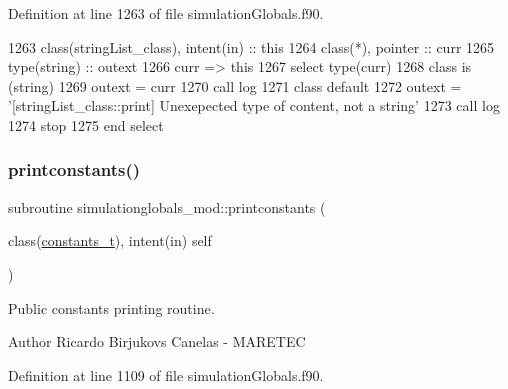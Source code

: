 Definition at line 1263 of file simulation\+Globals.\+f90.


\begin{DoxyCode}
1263     \textcolor{keywordtype}{class}(stringList\_class), \textcolor{keywordtype}{intent(in)} :: this
1264     \textcolor{keywordtype}{class}(*), \textcolor{keywordtype}{pointer} :: curr
1265     \textcolor{keywordtype}{type}(string) :: outext
1266     curr => this%
1267     \textcolor{keywordflow}{select type}(curr)
1268 \textcolor{keywordflow}{    class is} (string)
1269         outext = curr
1270         \textcolor{keyword}{call }log%
1271 \textcolor{keywordflow}{        class default}
1272         outext = \textcolor{stringliteral}{'[stringList\_class::print] Unexepected type of content, not a string'}
1273         \textcolor{keyword}{call }log%
1274         stop
1275 \textcolor{keywordflow}{    end select}
\end{DoxyCode}
\mbox{\label{namespacesimulationglobals__mod_a139cb36f8366e6aec875c7977235fd68}} 
\subsubsection{\texorpdfstring{printconstants()}{printconstants()}}
{\footnotesize\ttfamily subroutine simulationglobals\+\_\+mod\+::printconstants (\begin{DoxyParamCaption}\item[{class(\mbox{\hyperlink{structsimulationglobals__mod_1_1constants__t}{constants\+\_\+t}}), intent(in)}]{self }\end{DoxyParamCaption})\hspace{0.3cm}{\ttfamily [private]}}



Public constants printing routine. 

\begin{DoxyAuthor}{Author}
Ricardo Birjukovs Canelas -\/ M\+A\+R\+E\+T\+EC 
\end{DoxyAuthor}


Definition at line 1109 of file simulation\+Globals.\+f90.


